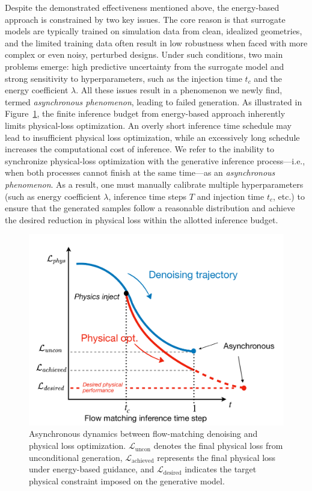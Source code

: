 Despite the demonstrated effectiveness mentioned above, the energy-based approach is constrained by two key issues. The core reason is that surrogate models are typically trained on simulation data from clean, idealized geometries, and the limited training data often result in low robustness when faced with more complex or even noisy, perturbed designs. Under such conditions, two main problems emerge: high predictive uncertainty from the surrogate model and strong sensitivity to hyperparameters, such as the injection time $t_c$ and the energy coefficient $\lambda$. All these issues result in a phenomenon we newly find, termed \textit{asynchronous phenomenon}, leading to failed generation. As illustrated in Figure~\ref{ch7:fig:asynchronous}, the finite inference budget from energy-based approach inherently limits physical-loss optimization. An overly short inference time schedule may lead to insufficient physical loss optimization, while an excessively long schedule increases the computational cost of inference. We refer to the inability to synchronize physical-loss optimization with the generative inference process---i.e., when both processes cannot finish at the same time---as an \textit{asynchronous phenomenon}. As a result, one must manually calibrate multiple hyperparameters (such as energy coefficient $\lambda$, inference time steps $T$ and injection time $t_c$, etc.) to ensure that the generated samples follow a reasonable distribution and achieve the desired reduction in physical loss within the allotted inference budget.
\begin{figure}
    \centering
    \includegraphics[width=0.75\linewidth]{chapter7/fig/Asynchronous.pdf}
    \caption{Asynchronous dynamics between flow-matching denoising and physical loss optimization. $\mathcal{L}_{\text{uncon}}$ denotes the final physical loss from unconditional generation, $\mathcal{L}_{\text{achieved}}$ represents the final physical loss under energy-based guidance, and $\mathcal{L}_{\text{desired}}$ indicates the target physical constraint imposed on the generative model.}
    \label{ch7:fig:asynchronous}
\end{figure}

